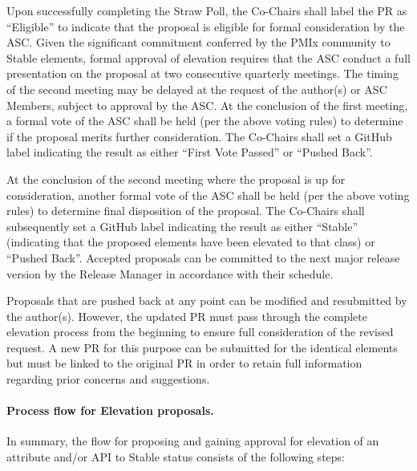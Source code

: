 \documentclass{article}
\begin{document}
Upon successfully completing the Straw Poll, the Co-Chairs shall label
the PR as ``Eligible'' to indicate that the proposal is
eligible for formal consideration by the ASC. Given the significant
commitment conferred by the PMIx community to Stable elements,
formal approval of elevation requires that the ASC conduct a full
presentation on the proposal at two consecutive quarterly meetings. The
timing of the second meeting may be delayed at the request of the
author(s) or ASC Members, subject to approval by the ASC. At the
conclusion of the first meeting, a formal vote of the ASC shall be held
(per the above voting rules) to determine if the proposal merits further
consideration. The Co-Chairs shall set a GitHub label indicating the
result as either ``First Vote Passed'' or ``Pushed
Back''.

At the conclusion of the second meeting where the proposal is up for
consideration, another formal vote of the ASC shall be held (per the
above voting rules) to determine final disposition of the proposal. The
Co-Chairs shall subsequently set a GitHub label indicating the result as
either ``Stable'' (indicating that the proposed elements have
been elevated to that class) or ``Pushed Back''. Accepted
proposals can be committed to the next major release version by the
Release Manager in accordance with their schedule.

Proposals that are pushed back at any point can be modified and
resubmitted by the author(s). However, the updated PR must pass through
the complete elevation process from the beginning to ensure full
consideration of the revised request. A new PR for this purpose can be
submitted for the identical elements but must be linked to the original
PR in order to retain full information regarding prior concerns and
suggestions.

\hypertarget{process-flow-for-elevation-proposals}{%
\paragraph{Process flow for Elevation
proposals.}\label{process-flow-for-elevation-proposals}}

In summary, the flow for proposing and gaining approval for elevation of
an attribute and/or API to Stable status consists of the following
steps:
\end{document}
